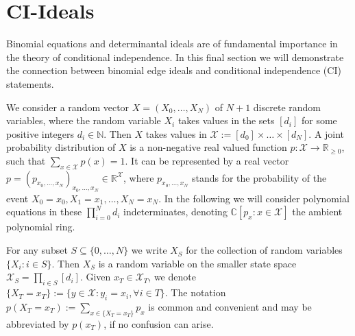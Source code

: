 \documentclass[11pt]{amsart}
\def\NZQ{\mathbb}               %
\def\NN{{\NZQ N}}
\def\RR{{\NZQ R}}
\def\CC{{\NZQ C}}
\let\to=\rightarrow
\begin{document}
\section{CI-Ideals}


Binomial equations and determinantal ideals are of fundamental importance in the theory of conditional independence. In
this final section we will demonstrate the connection between binomial edge ideals and conditional independence (CI)
statements.

We consider a random vector $X=(X_{0},\ldots,X_{N})$ of $N+1$ discrete random variables, where the random variable
$X_{i}$ takes values in the sets $[d_{i}]$ for some positive integers $d_{i}\in\NN$. Then $X$ takes values in
$\mathcal{X} := [d_{0}]\times\dots\times[d_{N}]$. A joint probability distribution of $X$ is a non-negative real valued
function $p:\mathcal{X} \to \RR_{\geq 0}$, such that $\sum_{x\in\mathcal{X}} p(x) = 1$. It can be represented by a real
vector $p = (p_{x_{0},\dots,x_{N}})_{x_{0},\dots,x_{N}}\in\RR^{\mathcal{X}}$, where $p_{x_{0},\ldots,x_{N}}$ stands for
the probability of the event $X_{0}=x_{0},X_{1}=x_{1},\ldots,X_{N}=x_{N}$. In the following we will consider polynomial
equations in these $\prod_{i=0}^{N} d_{i}$ indeterminates, denoting $\CC[p_{x} : x\in \mathcal{X}]$ the ambient
polynomial ring.

For any subset $S\subseteq\{0,\dots,N\}$ we write $X_{S}$ for the collection of random variables $\{X_{i}:i\in S\}$.
Then $X_{S}$ is a random variable on the smaller state space $\mathcal{X}_{S} = \prod_{i\in S}[d_{i}]$.  Given
$x_{T}\in \mathcal{X}_{T}$, we denote $\{X_{T} = x_{T}\} := \{y \in \mathcal{X} : y_{i} = x_{i}, \forall i \in T \}$.
The notation $p(X_{T} = x_{T}) := \sum_{x\in\{X_{T}=x_{T}\}}p_{x}$ is common and convenient and may be abbreviated by
$p(x_{T})$, if no confusion can arise.
\end{document}
